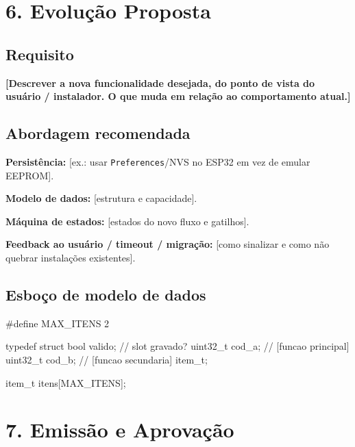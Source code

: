 \documentclass{anafw}
\begin{document}
\section{6. Evolução Proposta}

\subsection{Requisito}

\textbf{[Descrever a nova funcionalidade desejada, do ponto de vista do usuário /
instalador. O que muda em relação ao comportamento atual.]}

\begin{premissabox}
\end{premissabox}

\subsection{Abordagem recomendada}

\begin{listaItens}
  \item \textbf{Persistência:} [ex.: usar \texttt{Preferences}/NVS no ESP32 em vez de emular EEPROM].
  \item \textbf{Modelo de dados:} [estrutura e capacidade].
  \item \textbf{Máquina de estados:} [estados do novo fluxo e gatilhos].
  \item \textbf{Feedback ao usuário / timeout / migração:} [como sinalizar e como não quebrar instalações existentes].
\end{listaItens}

\subsection{Esboço de modelo de dados}

\begin{codigo}[language=C]
#define MAX_ITENS 2

typedef struct {
    bool     valido;     // slot gravado?
    uint32_t cod_a;      // [funcao principal]
    uint32_t cod_b;      // [funcao secundaria]
} item_t;

item_t itens[MAX_ITENS];
\end{codigo}


\section{7. Emissão e Aprovação}

\fazerAssinaturas
\end{document}
